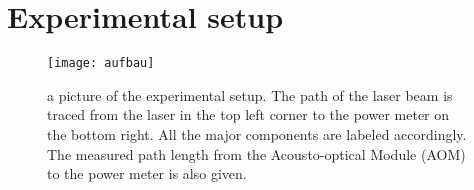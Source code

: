 
\section{Experimental setup}

\begin{figure}[H]
	\centering
	\texttt{[image: aufbau]}
	\caption{a picture of the experimental setup. The path of the laser beam is traced from the laser in the top left corner to the power meter on the bottom right. All the major components are labeled accordingly. The measured path length from the Acousto-optical Module (AOM) to the power meter is also given.}
	\label{fig:setup}
\end{figure}
